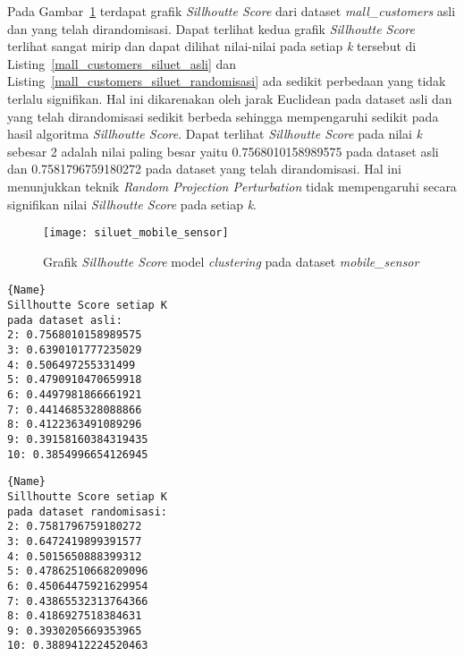 Pada Gambar~\ref{fig:siluet_mobile_sensor} terdapat grafik \textit{Sillhoutte Score} dari dataset \textit{mall\_customers} asli dan yang telah dirandomisasi. Dapat terlihat kedua grafik \textit{Sillhoutte Score} terlihat sangat mirip dan dapat dilihat nilai-nilai pada setiap \textit{k} tersebut di Listing~\ref{mall_customers_siluet_asli} dan Listing~\ref{mall_customers_siluet_randomisasi} ada sedikit perbedaan yang tidak terlalu signifikan. Hal ini dikarenakan oleh jarak Euclidean pada dataset asli dan yang telah dirandomisasi sedikit berbeda sehingga mempengaruhi sedikit pada hasil algoritma \textit{Sillhoutte Score}. Dapat terlihat \textit{Sillhoutte Score} pada nilai \textit{k} sebesar 2 adalah nilai paling besar yaitu 0.7568010158989575 pada dataset asli dan 0.7581796759180272 pada dataset yang telah dirandomisasi. Hal ini menunjukkan teknik \textit{Random Projection Perturbation} tidak mempengaruhi secara signifikan nilai \textit{Sillhoutte Score} pada setiap \textit{k}.

\begin{figure}
	\centering
	\texttt{[image: siluet\_mobile\_sensor]}
	\caption{Grafik \textit{Sillhoutte Score} model \textit{clustering} pada dataset \textit{mobile\_sensor}}
	\label{fig:siluet_mobile_sensor}
\end{figure}

\noindent\begin{minipage}{.48\textwidth}
\begin{lstlisting}[caption=Sillhoutte Score Dataset Asli,frame=tlrb, label=mall_customers_siluet_asli]{Name}
Sillhoutte Score setiap K
pada dataset asli: 
2: 0.7568010158989575
3: 0.6390101777235029
4: 0.506497255331499
5: 0.4790910470659918
6: 0.4497981866661921
7: 0.4414685328088866
8: 0.4122363491089296
9: 0.39158160384319435
10: 0.3854996654126945
\end{lstlisting}
\end{minipage}\hfill
\begin{minipage}{.48\textwidth}
\begin{lstlisting}[caption=Sillhoutte Score Dataset Randomisasi,frame=tlrb, label=mall_customers_siluet_randomisasi]{Name}
Sillhoutte Score setiap K
pada dataset randomisasi: 
2: 0.7581796759180272
3: 0.6472419899391577
4: 0.5015650888399312
5: 0.47862510668209096
6: 0.45064475921629954
7: 0.43865532313764366
8: 0.4186927518384631
9: 0.3930205669353965
10: 0.3889412224520463
\end{lstlisting}
\end{minipage}

